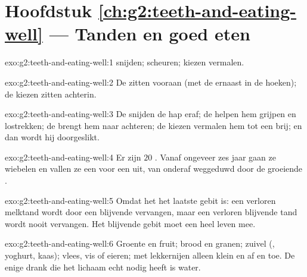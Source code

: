 \section*{Hoofdstuk \ref{ch:g2:teeth-and-eating-well} --- Tanden en goed eten}

\begin{solution}{exo:g2:teeth-and-eating-well:1}
 snijden;  scheuren; kiezen vermalen.
\end{solution}

\begin{solution}{exo:g2:teeth-and-eating-well:2}
De  zitten vooraan (met de  ernaast in de hoeken);
de kiezen zitten achterin.
\end{solution}

\begin{solution}{exo:g2:teeth-and-eating-well:3}
De  snijden de hap eraf; de  helpen hem grijpen en
lostrekken; de  brengt hem naar achteren; de kiezen vermalen hem
tot een brij; en dan wordt hij doorgeslikt.
\end{solution}

\begin{solution}{exo:g2:teeth-and-eating-well:4}
Er zijn $20$ . Vanaf ongeveer zes jaar gaan ze wiebelen en
vallen ze een voor een uit, van onderaf weggeduwd door de groeiende
.
\end{solution}

\begin{solution}{exo:g2:teeth-and-eating-well:5}
Omdat het het laatste gebit is: een verloren melktand wordt door een
blijvende vervangen, maar een verloren blijvende tand wordt nooit
vervangen. Het blijvende gebit moet een heel leven mee.
\end{solution}

\begin{solution}{exo:g2:teeth-and-eating-well:6}
Groente en fruit; brood en granen; zuivel (, yoghurt, kaas); vlees,
vis of eieren; met lekkernijen alleen klein en af en toe. De enige
drank die het lichaam echt nodig heeft is water.
\end{solution}

